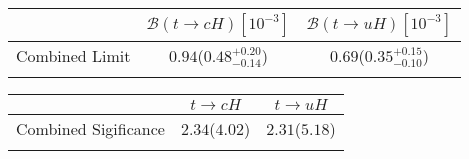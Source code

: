 \centering
\begin{tabular}{ccc} \toprule\toprule
 & $\mathcal{B}(t\to cH)[10^{-3}]$ & $\mathcal{B}(t\to uH)[10^{-3}]$\\\midrule
Combined Limit & $0.94$($0.48^{+0.20}_{-0.14}$) & $0.69$($0.35^{+0.15}_{-0.10}$)\\
\bottomrule\bottomrule\\
\end{tabular}

\centering
\begin{tabular}{ccc} \toprule\toprule
 & $t\to cH$ & $t\to uH$\\\midrule
Combined Sigificance & $2.34$($4.02$) & $2.31$($5.18$)\\
\bottomrule\bottomrule\\
\end{tabular}
